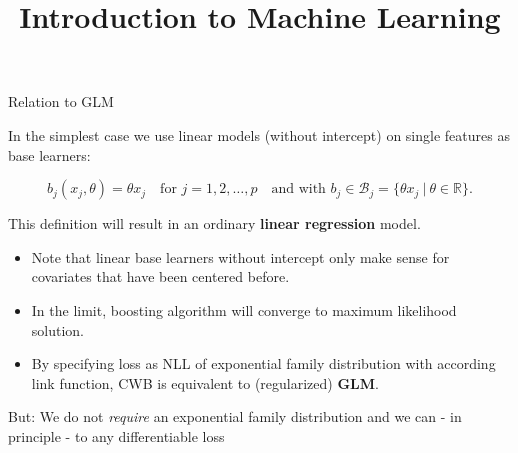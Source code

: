\documentclass[11pt,compress,t,notes=noshow, xcolor=table]{beamer}
\title{Introduction to Machine Learning}\date{}
\begin{document}


\begin{vbframe}{Relation to GLM}

In the simplest case we use linear models (without intercept) on single features
as base learners:

$$
  b_j(x_j,\theta) = \theta x_j  \quad \text{for } j = 1, 2, \dots, p \quad
  \text{and with } b_j \in \mathcal{B}_j = \{\theta x_j  ~\rvert~ \theta \in
  \mathbb{R} \}.
$$


This definition will result in an ordinary \textbf{linear regression} model.



\begin{itemize}
  \item Note that linear base learners without intercept only make sense for
  covariates that have been centered before.
  \item In the limit, boosting algorithm will converge to maximum likelihood solution.
  \item By specifying loss as NLL of exponential family distribution with according link function, CWB is equivalent to (regularized) \textbf{GLM}.
\end{itemize}

\framebreak


But: We do not \emph{require} an exponential family distribution and we can - in principle - to any differentiable loss %


\end{vbframe}
\end{document}
